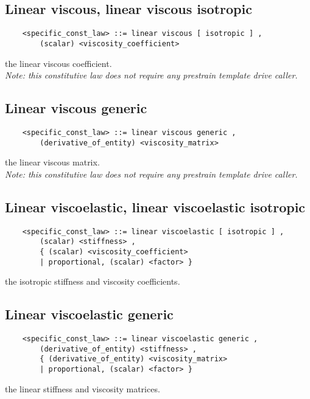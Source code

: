 \subsection{Linear viscous, linear viscous isotropic}
\begin{verbatim}
    <specific_const_law> ::= linear viscous [ isotropic ] , 
        (scalar) <viscosity_coefficient>
\end{verbatim}
the linear viscous coefficient. \\
{\em 
    Note: this constitutive law does not require any prestrain template
    drive caller.
}
  
\subsection{Linear viscous generic}
\begin{verbatim}
    <specific_const_law> ::= linear viscous generic , 
        (derivative_of_entity) <viscosity_matrix>
\end{verbatim}
the linear viscous matrix. \\
{\em 
    Note: this constitutive law does not require any prestrain template
    drive caller.
}
  
\subsection{Linear viscoelastic, linear viscoelastic isotropic}
\begin{verbatim}
    <specific_const_law> ::= linear viscoelastic [ isotropic ] ,
        (scalar) <stiffness> ,
        { (scalar) <viscosity_coefficient>
        | proportional, (scalar) <factor> }
\end{verbatim}
the isotropic stiffness and viscosity coefficients.
  
\subsection{Linear viscoelastic generic}
\begin{verbatim}
    <specific_const_law> ::= linear viscoelastic generic ,  
        (derivative_of_entity) <stiffness> ,
        { (derivative_of_entity) <viscosity_matrix> 
        | proportional, (scalar) <factor> }
\end{verbatim}
the linear stiffness and viscosity matrices.
  
